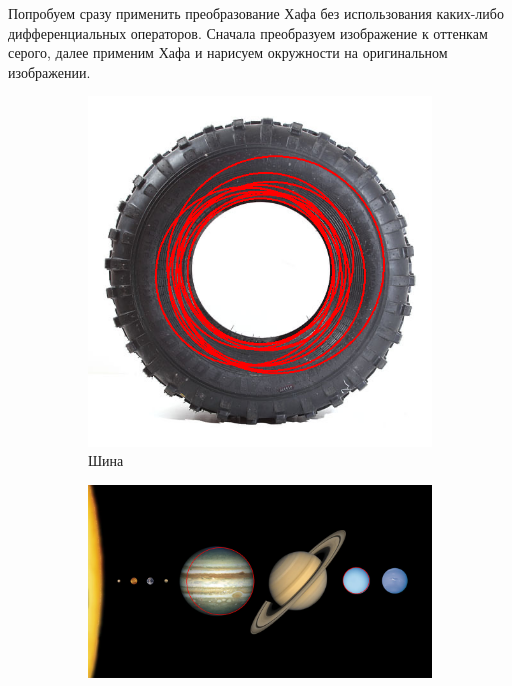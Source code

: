 \documentclass[a4paper, 16pt]{article}
\begin{document}
    \noindent Попробуем сразу применить преобразование Хафа без использования каких-либо дифференциальных операторов.
    Сначала преобразуем изображение к оттенкам серого, далее применим Хафа и нарисуем окружности на оригинальном изображении.
    \begin{figure}[htbp]
        \centering
        \begin{subfigure}{0.3\textwidth}
            \centering
            \includegraphics[scale=0.15]{hc_ci1.png}
            \caption{Шина}
            \label{fig:hc_ci1}
        \end{subfigure}
        \hfill
        \begin{subfigure}{0.3\textwidth}
            \centering
            \includegraphics[width=\linewidth]{hc_ci2.png}

\end{subfigure}
\end{figure}
\end{document}

